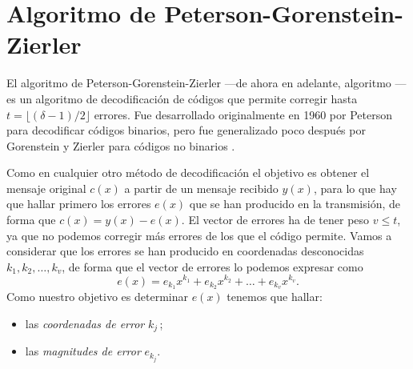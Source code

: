 \section{Algoritmo de Peterson-Gorenstein-Zierler}

El algoritmo de Peterson-Gorenstein-Zierler —de ahora en adelante, algoritmo — es un algoritmo de decodificación de códigos  que permite corregir hasta \(t = \lfloor (\delta - 1)/2 \rfloor\) errores.
Fue desarrollado originalmente en 1960 por Peterson \parencite{peterson_encoding_1960} para decodificar códigos  binarios, pero fue generalizado poco después por Gorenstein y Zierler para códigos no binarios \parencite{gorenstein_class_1961}.

Como en cualquier otro método de decodificación el objetivo es obtener el mensaje original \(c(x)\) a partir de un mensaje recibido \(y(x)\), para lo que hay que hallar primero los errores \(e(x)\) que se han producido en la transmisión, de forma que \(c(x) = y(x) - e(x)\).
El vector de errores ha de tener peso \(v \leq t\), ya que no podemos corregir más errores de los que el código permite.
Vamos a considerar que los errores se han producido en coordenadas desconocidas \(k_1, k_2, \dots, k_v\), de forma que el vector de errores lo podemos expresar como
\[
  e(x) = e_{k_1}x^{k_1} + e_{k_2}x^{k_2} + \dots + e_{k_v}x^{k_v}.
\]
Como nuestro objetivo es determinar \(e(x)\) tenemos que hallar: \begin{itemize}
  \item las \textit{coordenadas de error} \(k_j\)\,;
  \item las \textit{magnitudes de error} \(e_{k_j}\).
\end{itemize}

